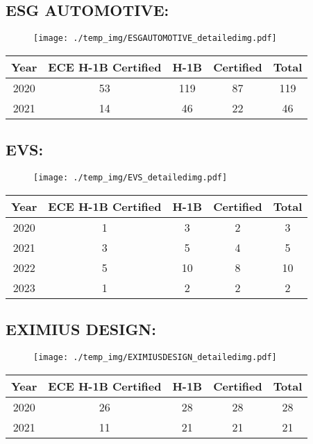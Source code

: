 \documentclass{article}%
\begin{document}
%
\newpage%
\subsection{ESG AUTOMOTIVE:}%
\label{subsec:ESGAUTOMOTIVE}%
\label{ESGAUTOMOTIVEdetailed}%


\begin{figure}[htbp]%
\centering%
\texttt{[image: ./temp\_img/ESGAUTOMOTIVE\_detailedimg.pdf]}%
\end{figure}

%
\begin{longtable}{c|c|c|c|c}%
\hline%
Year&ECE H{-}1B Certified&H{-}1B&Certified&Total\\%
\hline%
2020&53&119&87&119\\%
\hline%
2021&14&46&22&46\\%
\hline%
\end{longtable}

%
\newpage%
\subsection{EVS:}%
\label{subsec:EVS}%
\label{EVSdetailed}%


\begin{figure}[htbp]%
\centering%
\texttt{[image: ./temp\_img/EVS\_detailedimg.pdf]}%
\end{figure}

%
\begin{longtable}{c|c|c|c|c}%
\hline%
Year&ECE H{-}1B Certified&H{-}1B&Certified&Total\\%
\hline%
2020&1&3&2&3\\%
\hline%
2021&3&5&4&5\\%
\hline%
2022&5&10&8&10\\%
\hline%
2023&1&2&2&2\\%
\hline%
\end{longtable}

%
\newpage%
\subsection{EXIMIUS DESIGN:}%
\label{subsec:EXIMIUSDESIGN}%
\label{EXIMIUSDESIGNdetailed}%


\begin{figure}[htbp]%
\centering%
\texttt{[image: ./temp\_img/EXIMIUSDESIGN\_detailedimg.pdf]}%
\end{figure}

%
\begin{longtable}{c|c|c|c|c}%
\hline%
Year&ECE H{-}1B Certified&H{-}1B&Certified&Total\\%
\hline%
2020&26&28&28&28\\%
\hline%
2021&11&21&21&21\\%
\hline%
\end{longtable}
\end{document}
